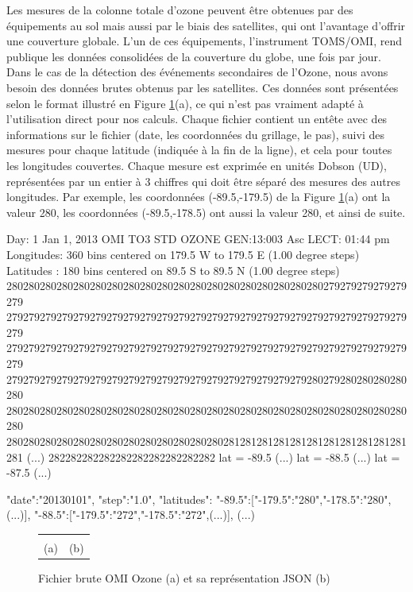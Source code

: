 Les mesures de la colonne totale d'ozone peuvent être obtenues par des équipements au sol mais aussi par le biais des satellites, qui ont l'avantage d'offrir une couverture globale. L'un de ces équipements, l'instrument TOMS/OMI, rend publique les données consolidées de la couverture du globe, une fois par jour. Dans le cas de la détection des événements secondaires de l'Ozone, nous avons besoin des données brutes obtenus par les satellites. Ces données sont présentées selon le format illustré en Figure \ref{fig:toms}(a), ce qui n'est pas vraiment adapté à l'utilisation direct pour nos calculs. Chaque fichier contient un entête avec des informations sur le fichier (date, les coordonnées du grillage, le pas), suivi des mesures pour chaque latitude (indiquée à la fin de la ligne), et cela pour toutes les longitudes couvertes. Chaque mesure est exprimée en unités Dobson (UD), représentées par un entier à 3 chiffres qui doit être séparé des mesures des autres longitudes. Par exemple, les coordonnées (-89.5,-179.5) de la Figure \ref{fig:toms}(a) ont la valeur 280, les coordonnées (-89.5,-178.5) ont aussi la valeur 280, et ainsi de suite.   

\begin{myverbbox}[\tiny]{\TOMS}
	Day:   1 Jan  1, 2013    OMI TO3    STD OZONE    GEN:13:003 Asc LECT: 01:44 pm 
	Longitudes:  360 bins centered on 179.5  W  to 179.5  E   (1.00 degree steps)
	Latitudes :  180 bins centered on  89.5  S  to  89.5  N   (1.00 degree steps)
	280280280280280280280280280280280280280280280280280280280279279279279279279
	279279279279279279279279279279279279279279279279279279279279279279279279279
	279279279279279279279279279279279279279279279279279279279279279279279279279
	279279279279279279279279279279279279279279279279279279280279280280280280280
	280280280280280280280280280280280280280280280280280280280280280280280280280
	280280280280280280280280280280280280280281281281281281281281281281281281281
	(...)
	282282282282282282282282282282   lat =  -89.5
	(...)   lat =  -88.5
	(...)   lat =  -87.5
	(...)
\end{myverbbox}

\begin{myverbbox}[\tiny]{\JSON}
	{
		"date":"20130101",
		"step":"1.0",
		"latitudes":{
			"-89.5":["-179.5":"280","-178.5":"280",(...)],
			"-88.5":["-179.5":"272","-178.5":"272",(...)],
			(...)
		}
	}
\end{myverbbox}

\begin{figure}
	\centering
	\begin{tabular}{cc}
		\imagetop{\TOMS}&\imagetop{\JSON}\\
		{\small (a)}&{\small (b)}
	\end{tabular}
	\caption{Fichier brute OMI Ozone (a) et sa représentation JSON (b)}\label{fig:toms}
	
\end{figure}

